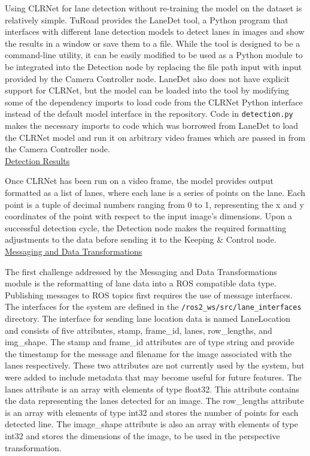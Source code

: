 \documentclass[titlepage,draft]{article}
\begin{document}
{Using CLRNet for lane detection without re-training the model on the dataset is relatively simple.
TuRoad provides the LaneDet \cite{LaneDet} tool, a Python program that interfaces with different lane detection models
to detect lanes in images and show the results in a window or save them to a file.
While the tool is designed to be a command-line utility, it can be easily modified to be used as a Python module
to be integrated into the Detection node by replacing the file path input with input provided by the Camera Controller node.
LaneDet also does not have explicit support for CLRNet, but the model can be loaded into the tool by modifying some of
the dependency imports to load code from the CLRNet Python interface instead of the default model interface in the repository.
Code in \texttt{detection.py} makes the necessary imports to code which was borrowed from LaneDet to load the
CLRNet model and run it on arbitrary video frames which are passed in from the Camera Controller node.
\\

\underline{Detection Results}

Once CLRNet has been run on a video frame, the model provides output formatted as a list of lanes, where each lane is
a series of points on the lane.
Each point is a tuple of decimal numbers ranging from 0 to 1, representing the x and y coordinates of the point with
respect to the input image's dimensions.
Upon a successful detection cycle, the Detection node makes the required formatting adjustments to the data before sending
it to the Keeping \& Control node.
\\


\underline{Messaging and Data Transformations}


The first challenge addressed by the Messaging and Data Transformations module is the reformatting of lane data into a ROS compatible data type. Publishing messages to ROS topics first requires the use of message interfaces. The interfaces for the system are defined in the \texttt{/ros2\_ws/src/lane\_interfaces} directory. The interface for sending lane location data is named LaneLocation and consists of five attributes, stamp, frame\_id, lanes, row\_lengths, and img\_shape. The stamp and frame\_id attributes are of type string and provide the timestamp for the message and filename for the image associated with the lanes respectively. These two attributes are not currently used by the system, but were added to include metadata that may become useful for future features. The lanes attribute is an array with elements of type float32. This attribute contains the data representing the lanes detected for an image. The row\_lengths attribute is an array with elements of type int32 and stores the number of points for each detected line. The image\_shape attribute is also an array with elements of type int32 and stores the dimensions of the image, to be used in the perspective transformation.

}
\end{document}
